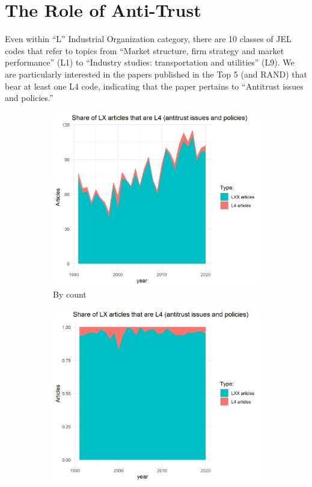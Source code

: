 \documentclass[11pt, letterpaper, twoside]{article}
\begin{document}
\newpage

\section{The Role of Anti-Trust}
Even within ``L'' Industrial Organization category, there are 10 classes of JEL codes that refer to topics from ``Market structure, firm strategy and market performance'' (L1) to ``Industry studies: transportation and utilities'' (L9). We are particularly interested in the papers published in the Top 5 (and RAND) that bear at least one L4 code, indicating that the paper pertains to ``Antitrust issues and policies.''\\

\begin{figure}[!ht]
    \begin{subfigure}[h]{0.49\textwidth}
        \centering
        \includegraphics[width=\textwidth]{L4-vs-LXX.png}
        \caption{By count}
    \end{subfigure}
    \hfill
    \begin{subfigure}[h]{0.49\textwidth}
        \centering
        \includegraphics[width=\textwidth]{L4-vs-LXX-normalized.png}

\end{subfigure}
\end{figure}
\end{document}
